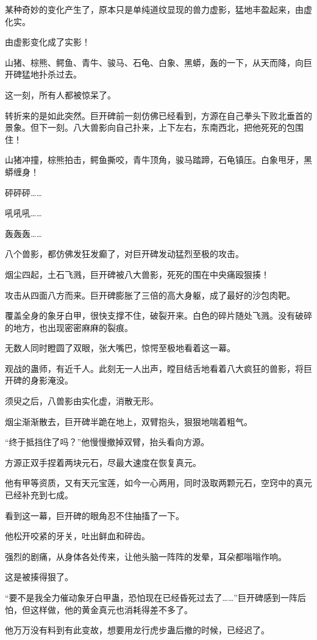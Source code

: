 \begin{this_body}
某种奇妙的变化产生了，原本只是单纯道纹显现的兽力虚影，猛地丰盈起来，由虚化实。

由虚影变化成了实影！

山猪、棕熊、鳄鱼、青牛、骏马、石龟、白象、黑蟒，轰的一下，从天而降，向巨开碑猛地扑杀过去。

这一刻，所有人都被惊呆了。

转折来的是如此突然。巨开碑前一刻仿佛已经看到，方源在自己拳头下败北垂首的景象。但下一刻。八大兽影向自己扑来，上下左右，东南西北，把他死死的包围住！

山猪冲撞，棕熊拍击，鳄鱼撕咬，青牛顶角，骏马踏蹄，石龟镇压。白象甩牙，黑蟒缠身！

砰砰砰……

吼吼吼……

轰轰轰……

八个兽影，都仿佛发狂发癫了，对巨开碑发动猛烈至极的攻击。

烟尘四起，土石飞溅，巨开碑被八大兽影，死死的围在中央痛殴狠揍！

攻击从四面八方而来。巨开碑膨胀了三倍的高大身躯，成了最好的沙包肉靶。

覆盖全身的象牙白甲，很快支撑不住，破裂开来。白色的碎片随处飞溅。没有破碎的地方，也出现密密麻麻的裂痕。

无数人同时瞪圆了双眼，张大嘴巴，惊愕至极地看着这一幕。

观战的蛊师，有近千人。此刻无一人出声，瞠目结舌地看着八大疯狂的兽影，将巨开碑的身影淹没。

须臾之后，八兽影由实化虚，消散无形。

烟尘渐渐散去，巨开碑半跪在地上，双臂抱头，狠狠地喘着粗气。

“终于抵挡住了吗？”他慢慢撤掉双臂，抬头看向方源。

方源正双手捏着两块元石，尽最大速度在恢复真元。

他有甲等资质，又有天元宝莲，如今一心两用，同时汲取两颗元石，空窍中的真元已经补充到七成。

看到这一幕，巨开碑的眼角忍不住抽搐了一下。

他松开咬紧的牙关，吐出鲜血和碎齿。

强烈的剧痛，从身体各处传来，让他头脑一阵阵的发晕，耳朵都嗡嗡作响。

这是被揍得狠了。

“要不是我全力催动象牙白甲蛊，恐怕现在已经昏死过去了……”巨开碑感到一阵后怕，但这样做，他的黄金真元也消耗得差不多了。

他万万没有料到有此变故，想要用龙行虎步蛊后撤的时候，已经迟了。


\end{this_body}
